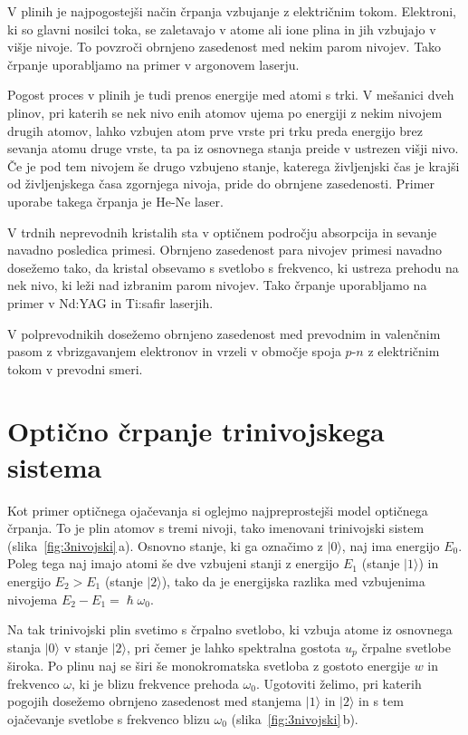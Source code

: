 V plinih je najpogostejši način črpanja vzbujanje z električnim tokom. Elektroni,
ki so glavni nosilci toka, se zaletavajo v atome ali ione plina in jih vzbujajo
v višje nivoje. To povzroči obrnjeno zasedenost med
nekim parom nivojev. Tako črpanje uporabljamo na primer v argonovem laserju. 

Pogost proces v plinih je tudi prenos energije med atomi s trki. V
mešanici dveh plinov, pri katerih se nek nivo enih atomov ujema po energiji z
nekim nivojem drugih atomov, lahko vzbujen atom prve vrste pri trku preda 
energijo brez sevanja atomu druge vrste, ta pa iz osnovnega stanja preide v 
ustrezen višji nivo. Če je pod tem nivojem še drugo vzbujeno stanje, katerega
življenjski čas je krajši od življenjskega časa zgornjega nivoja, pride
do obrnjene zasedenosti. Primer uporabe takega črpanja je He-Ne laser.

V trdnih neprevodnih kristalih sta v optičnem področju absorpcija
in sevanje navadno posledica primesi.
Obrnjeno zasedenost para nivojev primesi navadno dosežemo tako, da
kristal obsevamo s svetlobo s frekvenco, ki ustreza prehodu na nek
nivo, ki leži nad izbranim parom nivojev. Tako črpanje uporabljamo na primer v Nd:YAG in Ti:safir 
laserjih.  

V polprevodnikih dosežemo obrnjeno zasedenost med 
prevodnim in valenčnim pasom z vbrizgavanjem elektronov in vrzeli v območje spoja $p$-$n$ 
z električnim tokom v prevodni smeri. 

\section{Optično črpanje trinivojskega sistema}
Kot primer optičnega ojačevanja si oglejmo najpreprostejši model optičnega črpanja.
To je plin atomov s tremi nivoji, tako imenovani trinivojski sistem (slika~\ref{fig:3nivojski}\,a).
Osnovno stanje, ki 
ga označimo z $|0\rangle$,  naj ima energijo $E_0$. Poleg tega naj imajo atomi še 
dve vzbujeni stanji z energijo $E_1$ (stanje $|1\rangle$) in energijo $E_2>E_1$
(stanje $|2\rangle$), tako da je energijska razlika med vzbujenima 
nivojema $E_2-E_1 = \hslash \omega_0$.

Na tak trinivojski plin svetimo s črpalno svetlobo, ki vzbuja atome iz osnovnega stanja 
$|0\rangle$ v stanje $|2\rangle$, pri čemer je lahko spektralna gostota $u_{p}$ črpalne 
svetlobe široka. Po plinu naj se širi še monokromatska svetloba z gostoto 
energije $w$ in frekvenco $\omega$, ki je blizu frekvence prehoda $\omega_{0}$. 
Ugotoviti želimo, pri katerih pogojih  dosežemo obrnjeno zasedenost med 
stanjema $|1\rangle$ in $|2\rangle$ in s tem ojačevanje svetlobe s frekvenco blizu
$\omega_{0}$ (slika~\ref{fig:3nivojski}\,b).

